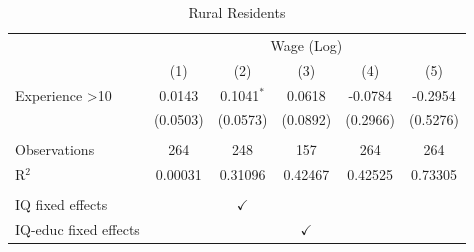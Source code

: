 
\begin{table}[htbp]
   \caption{\label{tab:wage_reg_rural} Rural Residents}
   \bigskip
   \centering
   \begin{tabular}{lccccc}
      \toprule
       & \multicolumn{5}{c}{Wage (Log)}\\
                            & (1)      & (2)           & (3)           & (4)      & (5)\\  
      \midrule 
      Experience >10        & 0.0143   & 0.1041$^{*}$  & 0.0618        & -0.0784  & -0.2954\\   
                            & (0.0503) & (0.0573)      & (0.0892)      & (0.2966) & (0.5276)\\   
       \\
      Observations          & 264      & 248           & 157           & 264      & 264\\  
      R$^2$                 & 0.00031  & 0.31096       & 0.42467       & 0.42525  & 0.73305\\  
       \\
      IQ fixed effects      &          & $\checkmark$  &               &          & \\  
      IQ-educ fixed effects &          &               & $\checkmark$  &          & \\  
      \bottomrule
   \end{tabular}
\end{table}


